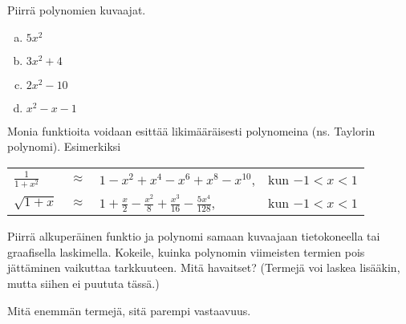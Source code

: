 \begin{tehtava}
    Piirrä polynomien kuvaajat.
    \begin{enumerate}[a)]
        \item $5x^2$
        \item $3x^2+4$
        \item $2x^2-10$
        \item $x^2-x-1$
    \end{enumerate}
    \begin{vastaus}
        \item \begin{kuvaajapohja}{0.4}{-4}{4}{-1}{7}
			  \end{kuvaajapohja}
    	\item \begin{kuvaajapohja}{0.4}{-4}{4}{-1}{11}
			  \end{kuvaajapohja}
		\item \begin{kuvaajapohja}{0.4}{-4}{4}{-11}{1}
			  \end{kuvaajapohja}
		\item \begin{kuvaajapohja}{0.4}{-3}{5}{-2}{6}
			  \end{kuvaajapohja}
    \end{vastaus}
\end{tehtava}

\begin{tehtava}
	Monia funktioita voidaan esittää likimääräisesti polynomeina (ns.
Taylorin polynomi). Esimerkiksi

	\begin{tabular}{lcll}
	$\frac{1}{1+x^2}$ &$\approx$ & $1-x^2+x^4-x^6+x^8-x^{10}$, & kun
$-1<x<1$ \\
	$\sqrt{1+x}$ & $\approx $ & $ 1+\frac{x}{2}
	-\frac{x^2}{8}+\frac{x^3}{16}-\frac{5x^4}{128}$, & kun $-1<x<1$
	\end{tabular}

	Piirrä alkuperäinen funktio ja polynomi samaan kuvaajaan tietokoneella
tai graafisella laskimella. Kokeile, kuinka polynomin viimeisten termien pois
jättäminen vaikuttaa tarkkuuteen. Mitä havaitset? (Termejä voi laskea lisääkin,
mutta siihen ei puututa tässä.)

	\begin{vastaus}
		Mitä enemmän termejä, sitä parempi vastaavuus.
	\end{vastaus}
\end{tehtava}
